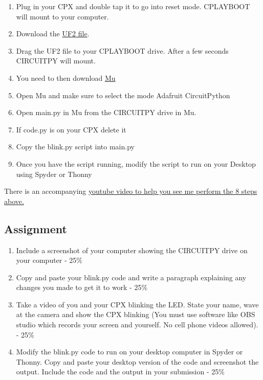 \begin{enumerate}[itemsep=-5pt]
\item Plug in your CPX and double tap it to go into reset
  mode. CPLAYBOOT will mount to your computer. 
\item Download the \href{https://circuitpython.org/downloads}{UF2
  file}.
\item Drag the UF2 file to your CPLAYBOOT drive. After a few seconds
  CIRCUITPY will mount.
\item You need to then download
  \href{https://codewith.mu/en/download}{Mu}
\item Open Mu and make sure to select the mode Adafruit CircuitPython
\item Open main.py in Mu from the CIRCUITPY drive in Mu.
\item If code.py is on your CPX delete it
\item Copy the blink.py script into main.py
\item Once you have the script running, modify the script to run on
  your Desktop using Spyder or Thonny
\end{enumerate}

There is an accompanying
\href{https://www.youtube.com/watch?v=XFvLn6rwm3I}{youtube video to
  help you see me perform the 8 steps above.}

\subsection{Assignment}



\begin{enumerate}[itemsep=-5pt]
\item Include a screenshot of your computer showing the CIRCUITPY drive on your computer - 25\%
\item Copy and paste your blink.py code and write a paragraph explaining any changes you made to get it to work - 25\%
\item Take a video of you and your CPX blinking the LED. State your name, wave at the camera and show the CPX blinking (You must use software like OBS studio which records your screen and yourself. No cell phone videos allowed). - 25\%
\item Modify the blink.py code to run on your desktop computer in
  Spyder or Thonny. Copy and paste your desktop version of the code
  and screenshot the output. Include the code and the output in your
  submission - 25\%
\end{enumerate}
